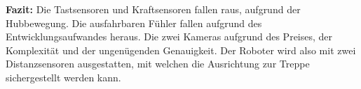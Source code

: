 \textbf{Fazit:} Die Tastsensoren und Kraftsensoren fallen raus, aufgrund der Hubbewegung. Die ausfahrbaren Fühler fallen aufgrund des Entwicklungsaufwandes heraus. Die zwei Kameras aufgrund des Preises, der Komplexität und der ungenügenden Genauigkeit. Der Roboter wird also mit zwei Distanzsensoren ausgestatten, mit welchen die Ausrichtung zur Treppe sichergestellt werden kann.